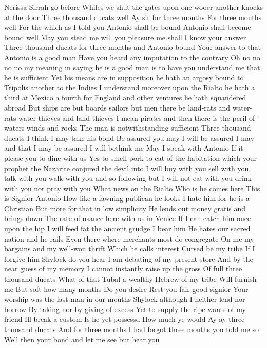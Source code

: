 Nerissa Sirrah go before
Whiles we shut the gates
upon one wooer another knocks at the door
Three thousand ducats well
Ay sir for three months
For three months well
For the which as I told you Antonio shall be bound
Antonio shall become bound well
May you stead me will you pleasure me shall I
know your answer
Three thousand ducats for three months and Antonio bound
Your answer to that
Antonio is a good man
Have you heard any imputation to the contrary
Oh no no no no my meaning in saying he is a
good man is to have you understand me that he is
sufficient Yet his means are in supposition he
hath an argosy bound to Tripolis another to the
Indies I understand moreover upon the Rialto he
hath a third at Mexico a fourth for England and
other ventures he hath squandered abroad But ships
are but boards sailors but men there be land-rats
and water-rats water-thieves and land-thieves I
mean pirates and then there is the peril of waters
winds and rocks The man is notwithstanding
sufficient Three thousand ducats I think I may
take his bond
Be assured you may
I will be assured I may and that I may be assured
I will bethink me May I speak with Antonio
If it please you to dine with us
Yes to smell pork to eat of the habitation which
your prophet the Nazarite conjured the devil into I
will buy with you sell with you talk with you
walk with you and so following but I will not eat
with you drink with you nor pray with you What
news on the Rialto Who is he comes here
This is Signior Antonio
How like a fawning publican he looks
I hate him for he is a Christian
But more for that in low simplicity
He lends out money gratis and brings down
The rate of usance here with us in Venice
If I can catch him once upon the hip
I will feed fat the ancient grudge I bear him
He hates our sacred nation and he rails
Even there where merchants most do congregate
On me my bargains and my well-won thrift
Which he calls interest Cursed be my tribe
If I forgive him
Shylock do you hear
I am debating of my present store
And by the near guess of my memory
I cannot instantly raise up the gross
Of full three thousand ducats What of that
Tubal a wealthy Hebrew of my tribe
Will furnish me But soft how many months
Do you desire
Rest you fair good signior
Your worship was the last man in our mouths
Shylock although I neither lend nor borrow
By taking nor by giving of excess
Yet to supply the ripe wants of my friend
Ill break a custom Is he yet possessd
How much ye would
Ay ay three thousand ducats
And for three months
I had forgot three months you told me so
Well then your bond and let me see but hear you
